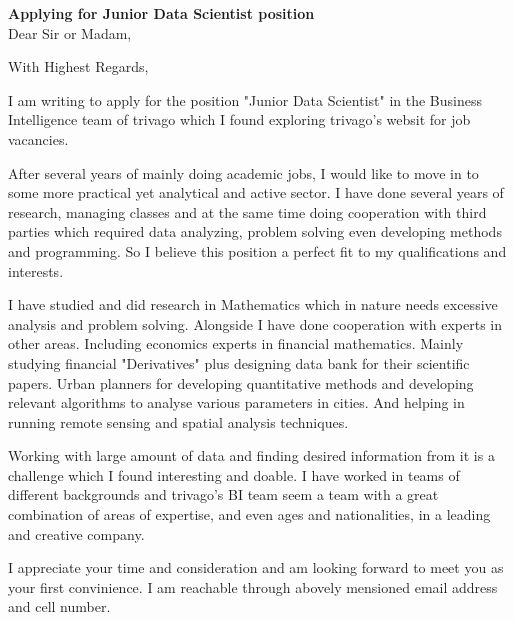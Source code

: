 \documentclass[11pt,a4paper,sans]{moderncv}        %
\title{}                               %
\begin{document}
\date{November 09, 2015}
\opening{\textbf{Applying for  Junior Data Scientist position}\\Dear Sir or Madam,}
\closing{With Highest Regards,}
\makelettertitle
I am writing to apply for the position "Junior Data Scientist" in the Business Intelligence team of trivago which I found exploring trivago's websit for job vacancies.

After several years of mainly doing academic jobs, I would like to move in to some more practical yet analytical and active sector. I have done several years of research, managing classes and at the same time doing  cooperation with third parties which required data analyzing, problem solving even developing methods and programming. So I believe this position a perfect fit to my qualifications and interests.

I have studied and did research in Mathematics which in nature needs excessive analysis and problem solving. Alongside I have done cooperation with experts in other areas. Including economics experts in financial mathematics. Mainly studying financial "Derivatives" plus designing data bank for their scientific papers. Urban planners for developing quantitative methods and developing relevant algorithms to analyse various parameters in cities. And helping in running remote sensing and spatial analysis techniques.

Working with large amount of data and finding desired information from it is a challenge which I found interesting and doable. I have worked in teams of different backgrounds and trivago's BI team seem a team with a great combination of areas of expertise, and even ages and nationalities, in a leading and creative company.

 I appreciate your time and consideration and am looking forward to meet you as your first convinience. I am reachable through abovely mensioned email address and cell number.
 \vspace{3mm}
 
\makeletterclosing
\end{document}
